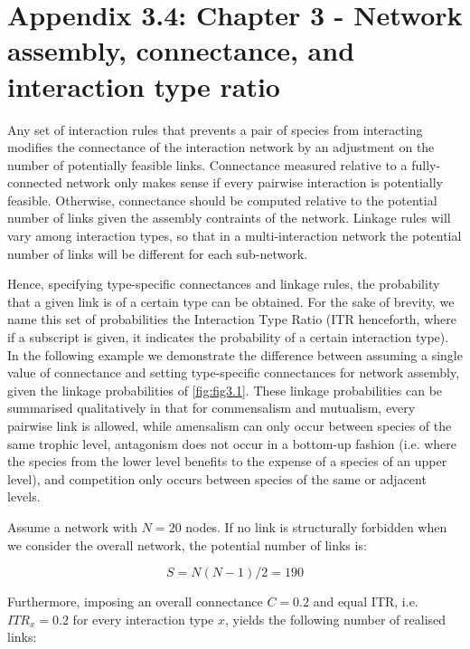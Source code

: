 \chapter[Appendix 3.4: Chapter 3 - Connectance and interaction ratio]{Appendix 3.4: Chapter 3 - Network assembly, connectance, and interaction type ratio}\label{ch:Appendix3.4}
\renewcommand{\thefigure}{A.3.4.\arabic{figure}}
\setcounter{figure}{0}

\renewcommand{\thetable}{A.3.4.\arabic{table}}
\setcounter{table}{0}

Any set of interaction rules that prevents a pair of species from interacting modifies the connectance of the interaction network by an adjustment on the number of potentially feasible links. Connectance measured relative to a fully-connected network only makes sense if every pairwise interaction is potentially feasible. Otherwise, connectance should be computed relative to the potential number of links given the assembly contraints of the network. Linkage rules will vary among interaction types, so that in a multi-interaction network the potential number of links will be different for each sub-network.

Hence, specifying type-specific connectances and linkage rules, the probability that a given link is of a certain type can be obtained. For the sake of brevity, we name this set of probabilities the Interaction Type Ratio (ITR henceforth, where if a subscript is given, it indicates the probability of a certain interaction type). In the following example we demonstrate the difference between assuming a single value of connectance and setting type-specific connectances for network assembly, given the linkage probabilities of \cref{fig:fig3.1}. These linkage probabilities can be summarised qualitatively in that for commensalism and mutualism, every pairwise link is allowed, while amensalism can only occur between species of the same trophic level, antagonism does not occur in a bottom-up fashion (i.e. where the species from the lower level benefits to the expense of a species of an upper level), and competition only occurs between species of the same or adjacent levels.

Assume a network with $N = 20$ nodes. If no link is structurally forbidden when we consider the overall network, the potential number of links is:

\[S = N(N-1)/2 = 190\]

Furthermore, imposing an overall connectance \(C = 0.2\) and equal ITR, i.e. \(ITR_x = 0.2\) for every interaction type \(x\), yields the following number of realised links:

